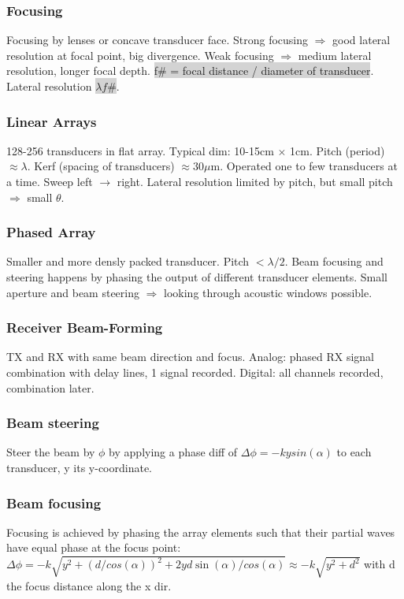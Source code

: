 \documentclass[9pt]{article}
\newcommand{\grey}[1]{\setlength{\fboxsep}{0pt}\colorbox{lightgrey}{#1}}
\begin{document}
\begin{multicols}{2}
\subsubsection{Focusing}
Focusing by lenses or concave transducer face.
Strong focusing $\Rightarrow$ good lateral resolution at focal point, big divergence. Weak focusing $\Rightarrow$ medium lateral resolution, longer focal depth. \grey{f\# = focal distance / diameter of transducer}. Lateral resolution \grey{$\lambda f\#$}.
\subsubsection{Linear Arrays}
128-256 transducers in flat array. Typical dim: 10-15cm $\times$ 1cm. Pitch (period) $\approx \lambda$. Kerf (spacing of transducers) $\approx 30\mu$m.
Operated one to few transducers at a time. Sweep left $\rightarrow$ right. Lateral resolution limited by pitch, but small pitch $\Rightarrow$ small $\theta$.

\subsubsection{Phased Array}
Smaller and more densly packed transducer. Pitch $< \lambda / 2$. Beam focusing and steering happens by phasing the output of different transducer elements.
Small aperture and beam steering $\Rightarrow$ looking through acoustic windows possible.

\subsubsection{Receiver Beam-Forming}
TX and RX with same beam direction and focus. Analog: phased RX signal combination with delay lines, 1 signal recorded. Digital: all channels recorded, combination later.

\subsubsection{Beam steering}
Steer the beam by $\phi$ by applying a phase diff of $\Delta \phi = -kysin(\alpha)$ to each transducer, y its y-coordinate.

\subsubsection{Beam focusing}
Focusing is achieved by phasing the array elements such that their partial waves have equal phase at the focus point: $\Delta \phi = -k\sqrt{y^2+(d/cos(\alpha))	^2+2yd\sin(\alpha)/cos(\alpha)} \approx -k \sqrt{y^2 + d^2}$ with d the focus distance along the x dir.

\end{multicols}
\end{document}
